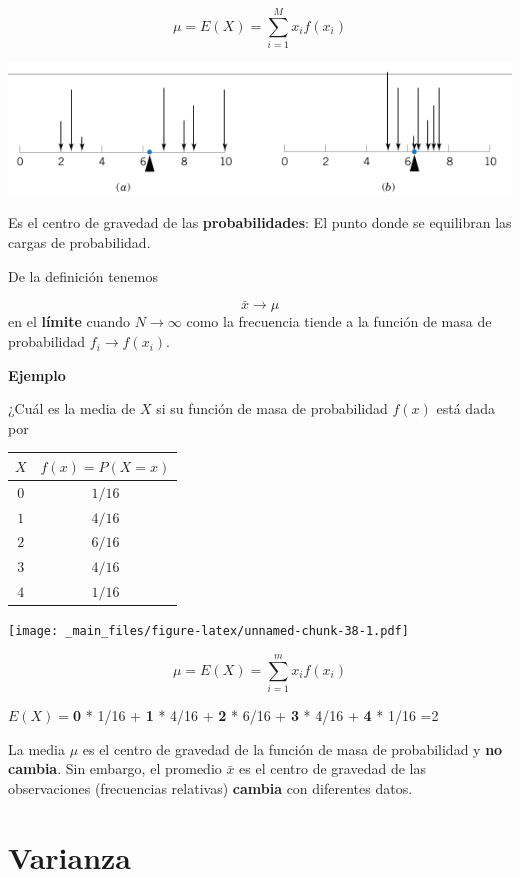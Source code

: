\documentclass[
]{book}
\begin{document}
\[ \mu = E(X)= \sum_{i=1}^M x_i f(x_i) \]

\includegraphics{./figures/mu.png}

Es el centro de gravedad de las \textbf{probabilidades}: El punto donde se equilibran las cargas de probabilidad.

De la definición tenemos

\[\bar{x} \rightarrow \mu\] en el \textbf{límite} cuando
\(N \rightarrow \infty\) como la frecuencia tiende a la función de masa de probabilidad \(f_i \rightarrow f(x_i)\).

\textbf{Ejemplo}

¿Cuál es la media de \(X\) si su función de masa de probabilidad \(f(x)\) está dada por

\begin{longtable}[]{@{}cc@{}}
\toprule\noalign{}
\(X\) & \(f(x)=P(X=x)\) \\
\midrule\noalign{}
\endhead
\bottomrule\noalign{}
\endlastfoot
\(0\) & \(1/16\) \\
\(1\) & \(4/16\) \\
\(2\) & \(6/16\) \\
\(3\) & \(4/16\) \\
\(4\) & \(1/16\) \\
\end{longtable}

\texttt{[image: \_main\_files/figure-latex/unnamed-chunk-38-1.pdf]}

\[ \mu =E(X)=\sum_{i=1}^m x_i f(x_i) \]

\(E(X)=\)\textbf{0} * 1/16 + \textbf{1} * 4/16 + \textbf{2} * 6/16 + \textbf{3} * 4/16 + \textbf{4} * 1/16 =2

La media \(\mu\) es el centro de gravedad de la función de masa de probabilidad y \textbf{no cambia}. Sin embargo, el promedio \(\bar{x}\) es el centro de gravedad de las observaciones (frecuencias relativas) \textbf{cambia} con diferentes datos.

\hypertarget{varianza}{%
\section{Varianza}\label{varianza}}
\end{document}

